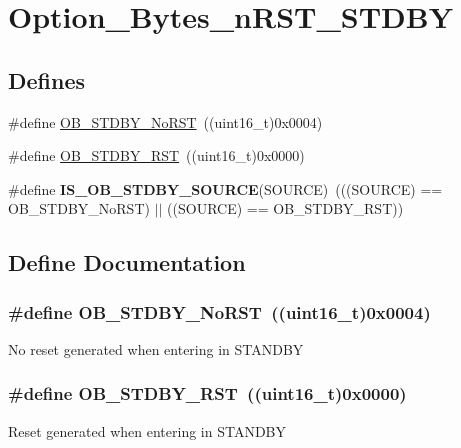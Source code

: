 \hypertarget{group__Option__Bytes__nRST__STDBY}{
\section{Option\_\-Bytes\_\-nRST\_\-STDBY}
\label{group__Option__Bytes__nRST__STDBY}
}
\subsection*{Defines}
\begin{DoxyCompactItemize}
\item 
\#define \hyperlink{group__Option__Bytes__nRST__STDBY_ga9588443b20719498422aeb72b65de839}{OB\_\-STDBY\_\-NoRST}~((uint16\_\-t)0x0004)
\item 
\#define \hyperlink{group__Option__Bytes__nRST__STDBY_ga69451a6f69247528f58735c9c83499ce}{OB\_\-STDBY\_\-RST}~((uint16\_\-t)0x0000)
\item 
\hypertarget{group__Option__Bytes__nRST__STDBY_ga8a05393df3a5e89551b4e2e1e8c5b884}{
\#define {\bfseries IS\_\-OB\_\-STDBY\_\-SOURCE}(SOURCE)~(((SOURCE) == OB\_\-STDBY\_\-NoRST) $|$$|$ ((SOURCE) == OB\_\-STDBY\_\-RST))}
\label{group__Option__Bytes__nRST__STDBY_ga8a05393df3a5e89551b4e2e1e8c5b884}

\end{DoxyCompactItemize}


\subsection{Define Documentation}
\hypertarget{group__Option__Bytes__nRST__STDBY_ga9588443b20719498422aeb72b65de839}{
\subsubsection[{OB\_\-STDBY\_\-NoRST}]{\setlength{\rightskip}{0pt plus 5cm}\#define OB\_\-STDBY\_\-NoRST~((uint16\_\-t)0x0004)}}
\label{group__Option__Bytes__nRST__STDBY_ga9588443b20719498422aeb72b65de839}
No reset generated when entering in STANDBY \hypertarget{group__Option__Bytes__nRST__STDBY_ga69451a6f69247528f58735c9c83499ce}{
\subsubsection[{OB\_\-STDBY\_\-RST}]{\setlength{\rightskip}{0pt plus 5cm}\#define OB\_\-STDBY\_\-RST~((uint16\_\-t)0x0000)}}
\label{group__Option__Bytes__nRST__STDBY_ga69451a6f69247528f58735c9c83499ce}
Reset generated when entering in STANDBY 